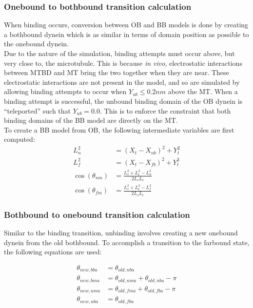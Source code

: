 \documentclass[
11pt, %
english, %
singlespacing, %
headsepline, %
chapterinoneline, %
]{MastersDoctoralThesis} %
\begin{document}
\subsubsection{Onebound to bothbound transition calculation}
When binding occurs, conversion between OB and BB models is done by creating a bothbound dynein which is as similar in terms of domain position as possible to the onebound dynein.\\

Due to the nature of the simulation, binding attempts must occur above, but very close to, the microtubule. This is because \textit{in vivo}, electrostatic interactions between MTBD and MT bring the two together when they are near. These electrostatic interactions are not present in the model, and so are simulated by allowing binding attempts to occur when $Y_{ub} \leq 0.2nm$ above the MT. When a binding attempt is successful, the unbound binding domain of the OB dynein is ``teleported'' such that $Y_{ub} = 0.0$. This is to enforce the constraint that both binding domains of the BB model are directly on the MT.\\

To create a BB model from OB, the following intermediate variables are first computed:\\

\begin{align}
  L_n^2 &= \left(X_t - X_{nb}\right)^2 + Y_t^2\\
  L_f^2 &= \left(X_t - X_{fb}\right)^2 + Y_t^2\\
  \cos(\theta_{nm}) &= \frac{L_s^2 + L_t^2 - L_n^2}{2L_sL_t}\\
  \cos(\theta_{fm}) &= \frac{L_s^2 + L_t^2 - L_f^2}{2L_sL_t}
\end{align}

\subsubsection{Bothbound to onebound transition calculation}
Similar to the binding transition, unbinding involves creating a new onebound dynein from the old bothbound. To accomplish a transition to the farbound state, the following equations are used:

\begin{align}
  \theta_{new,bba} &= \theta_{old,nba}\\
  \theta_{new,bma} &= \theta_{old,nma} + \theta_{old,nba} - \pi\\
  \theta_{new,uma} &= \theta_{old,fma} + \theta_{old,fba} - \pi\\
  \theta_{new,uba} &= \theta_{old,fba}
\end{align}
\end{document}
